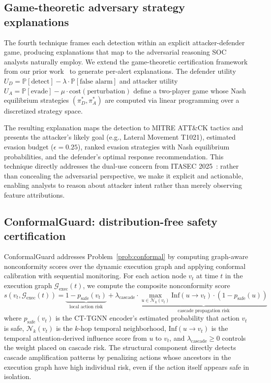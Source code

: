 \documentclass[preprint,review,12pt]{elsarticle}
\newcommand{\Prob}{\mathbb{P}}
\newcommand{\calG}{\mathcal{G}}
\newcommand{\calN}{\mathcal{N}}
\begin{document}
\subsection{Game-theoretic adversary strategy explanations}
\label{subsec:game_theory}

The fourth technique frames each detection within an explicit attacker-defender game, producing explanations that map to the adversarial reasoning SOC analysts naturally employ. We extend the game-theoretic certification framework from our prior work~\cite{anaedevha_game_theory} to generate per-alert explanations. The defender utility $U_D = \Prob[\text{detect}] - \lambda \cdot \Prob[\text{false alarm}]$ and attacker utility $U_A = \Prob[\text{evade}] - \mu \cdot \text{cost}(\text{perturbation})$ define a two-player game whose Nash equilibrium strategies $(\pi_D^*, \pi_A^*)$ are computed via linear programming over a discretized strategy space.

The resulting explanation maps the detection to MITRE ATT\&CK tactics and presents the attacker's likely goal (e.g., Lateral Movement T1021), estimated evasion budget ($\epsilon = 0.25$), ranked evasion strategies with Nash equilibrium probabilities, and the defender's optimal response recommendation. This technique directly addresses the dual-use concern from ITASEC 2025~\cite{itasec_dual_use_2025}: rather than concealing the adversarial perspective, we make it explicit and actionable, enabling analysts to reason about attacker intent rather than merely observing feature attributions.

\subsection{ConformalGuard: distribution-free safety certification}
\label{subsec:conformal_method}

ConformalGuard addresses Problem~\ref{prob:conformal} by computing graph-aware nonconformity scores over the dynamic execution graph and applying conformal calibration with sequential monitoring. For each action node $v_t$ at time $t$ in the execution graph $\calG_{\mathrm{exec}}(t)$, we compute the composite nonconformity score
\begin{equation}\label{eq:ncs}
    s(v_t, \calG_{\mathrm{exec}}(t)) = \underbrace{1 - p_{\mathrm{safe}}(v_t)}_{\text{local action risk}} + \lambda_{\mathrm{cascade}} \cdot \underbrace{\max_{u \in \calN_k(v_t)} \mathrm{Inf}(u \to v_t) \cdot (1 - p_{\mathrm{safe}}(u))}_{\text{cascade propagation risk}}
\end{equation}
where $p_{\mathrm{safe}}(v_t)$ is the CT-TGNN encoder's estimated probability that action $v_t$ is safe, $\calN_k(v_t)$ is the $k$-hop temporal neighborhood, $\mathrm{Inf}(u \to v_t)$ is the temporal attention-derived influence score from $u$ to $v_t$, and $\lambda_{\mathrm{cascade}} \geq 0$ controls the weight placed on cascade risk. The structural component directly detects cascade amplification patterns by penalizing actions whose ancestors in the execution graph have high individual risk, even if the action itself appears safe in isolation.
\end{document}
